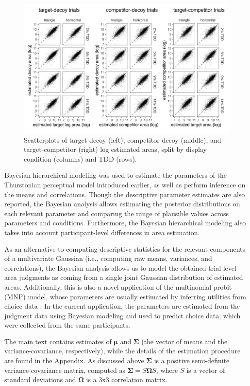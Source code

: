 \begin{figure}
   \includegraphics[width=\textwidth]{figures/circleAreaPhase_cor_plot_all_no_outliers.jpg}
   \caption{Scatterplots of target-decoy (left), competitor-decoy (middle), and target-competitor (right) log estimated areas, split by display condition (columns) and TDD (rows).}
   \label{fig:raw_cors}
\end{figure}

Bayesian hierarchical modeling was used to estimate the parameters of the Thurstonian perceptual model introduced earlier, as well as perform inference on the means and correlations. Though the descriptive parameter estimates are also reported, the Bayesian analysis allows estimating the posterior distributions on each relevant parameter and comparing the range of plausible values across parameters and conditions. Furthermore, the Bayesian hierarchical modeling also takes into account participant-level differences in area estimation. 

As an alternative to computing descriptive statistics for the relevant components of a multivariate Gaussian (i.e., computing raw means, variances, and correlations), the Bayesian analysis allows us to model the obtained trial-level area judgments as coming from a single joint Gaussian distribution of estimated areas. Additionally, this is also a novel application of the multinomial probit (MNP) model, whose parameters are usually estimated by inferring utilities from choice data \parencite{train2009discrete}. In the current application, the parameters are estimated from the judgment data using Bayesian modeling and used to predict choice data, which were collected from the same participants. 

The main text contains estimates of $\boldsymbol{\mu}$ and $\boldsymbol{\Sigma}$ (the vector of means and the variance-covariance, respectively), while the details of the estimation procedure are found in the Appendix. As discussed above $\boldsymbol{\Sigma}$ is a positive semi-definite variance-covariance matrix, computed as $\boldsymbol{\Sigma}=S\boldsymbol{\Omega}S$, where $S$ is a vector of standard deviations and $\boldsymbol{\Omega}$ is a $3\text{x}3$ correlation matrix. 

